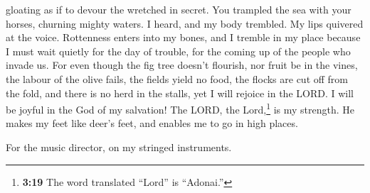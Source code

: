 gloating as if to devour the wretched in secret.  You
trampled the sea with your horses, churning mighty waters.
 I heard, and my body trembled. My lips quivered at the
voice. Rottenness enters into my bones, and I tremble in my place
because I must wait quietly for the day of trouble, for the coming up of
the people who invade us.  For even though the fig tree
doesn't flourish, nor fruit be in the vines, the labour of the olive
fails, the fields yield no food, the flocks are cut off from the fold,
and there is no herd in the stalls,  yet I will rejoice
in the LORD. I will be joyful in the God of my salvation!
 The LORD, the Lord,\footnote{\textbf{3:19} The word
  translated ``Lord'' is ``Adonai.''} is my strength. He makes my feet
like deer's feet, and enables me to go in high places.

For the music director, on my stringed instruments.
